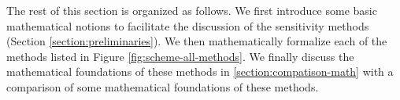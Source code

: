 
The rest of this section is organized as follows. 
We first introduce some basic mathematical notions to facilitate the discussion of the sensitivity methods (Section \ref{section:preliminaries}).
We then mathematically formalize each of the methods listed in Figure \ref{fig:scheme-all-methods}.
We finally discuss the mathematical foundations of these methods in \ref{section:compatison-math} with a comparison of some mathematical foundations of these methods. 
